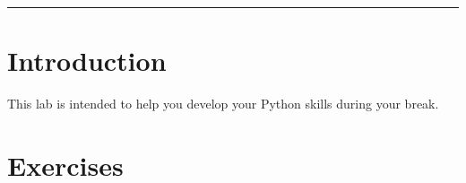 \documentclass[11pt]{cselabheader}
\title{\thetitle}
\author{\theauthor}
\date{NMT Department of Computer Science and Engineering}
\newcommand{\thelabnumber}{6 and $\frac{2}{7}$}
\begin{document}
\maketitle
\hrule

%
%
%
%
\section*{Introduction} %
This lab is intended to help you develop your Python skills during your break.

\renewcommand{\thelabnumber}{6.285714}

\renewcommand{\thelabnumber}{6 and $\frac{2}{7}$}

\newpage
{}

\newpage
\section{Exercises}\label{exercises}

\end{document}
